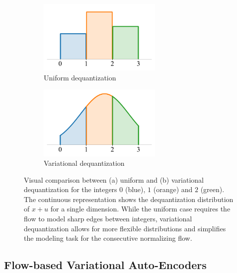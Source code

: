 \begin{figure}[t!]
    \centering
    \begin{subfigure}{0.4\textwidth}
        \centering
        \includegraphics[width=0.65\textwidth]{figures/related_work_figures/dequant.pdf}
        \caption{Uniform dequantization}
    \end{subfigure}
    \begin{subfigure}{0.4\textwidth}
        \centering
        \includegraphics[width=0.65\textwidth]{figures/related_work_figures/var_dequant.pdf}
        \caption{Variational dequantization}
    \end{subfigure}
    \caption[Uniform and variational dequantization]{Visual comparison between (a) uniform and (b) variational dequantization for the integers $0$ (blue), $1$ (orange) and $2$ (green). The continuous representation shows the dequantization distribution of $x+u$ for a single dimension. While the uniform case requires the flow to model sharp edges between integers, variational dequantization allows for more flexible distributions and simplifies the modeling task for the consecutive normalizing flow.}
    \label{fig:related_work_dequantization_techniques}
\end{figure}

\subsection{Flow-based Variational Auto-Encoders}
\label{sec:related_work_VAE_flow}

